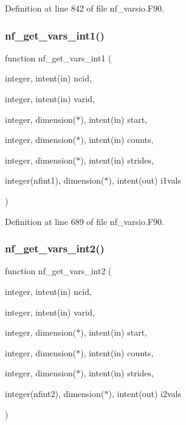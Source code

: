 Definition at line 842 of file nf\+\_\+varsio.\+F90.

\mbox{\label{nf__varsio_8F90_a96025ecd11790006d4fed45a975b2a1d}} 
\subsubsection{\texorpdfstring{nf\+\_\+get\+\_\+vars\+\_\+int1()}{nf\_get\_vars\_int1()}}
{\footnotesize\ttfamily function nf\+\_\+get\+\_\+vars\+\_\+int1 (\begin{DoxyParamCaption}\item[{integer, intent(in)}]{ncid,  }\item[{integer, intent(in)}]{varid,  }\item[{integer, dimension($\ast$), intent(in)}]{start,  }\item[{integer, dimension($\ast$), intent(in)}]{counts,  }\item[{integer, dimension($\ast$), intent(in)}]{strides,  }\item[{integer(nfint1), dimension($\ast$), intent(out)}]{i1vals }\end{DoxyParamCaption})}



Definition at line 689 of file nf\+\_\+varsio.\+F90.

\mbox{\label{nf__varsio_8F90_a92ab3fdc5dc6cba3ae8e4a3b79c6396f}} 
\subsubsection{\texorpdfstring{nf\+\_\+get\+\_\+vars\+\_\+int2()}{nf\_get\_vars\_int2()}}
{\footnotesize\ttfamily function nf\+\_\+get\+\_\+vars\+\_\+int2 (\begin{DoxyParamCaption}\item[{integer, intent(in)}]{ncid,  }\item[{integer, intent(in)}]{varid,  }\item[{integer, dimension($\ast$), intent(in)}]{start,  }\item[{integer, dimension($\ast$), intent(in)}]{counts,  }\item[{integer, dimension($\ast$), intent(in)}]{strides,  }\item[{integer(nfint2), dimension($\ast$), intent(out)}]{i2vals }\end{DoxyParamCaption})}



